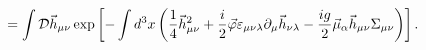 \begin{equation}
\label{unify}
=\int {\cal D}\vec h_{\mu\nu}\exp\left[-\int d^3x\left(
\frac14\vec h_{\mu\nu}^2+\frac{i}{2}\vec\varphi\varepsilon_{\mu\nu\lambda}\partial_\mu
\vec h_{\nu\lambda}-\frac{ig}{2}\vec\mu_\alpha\vec h_{\mu\nu}\Sigma_{\mu\nu}\right)\right].
\end{equation}


